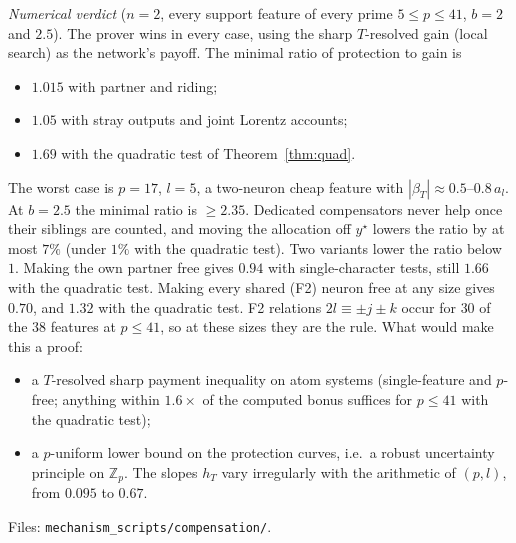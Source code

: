 \documentclass[11pt]{article}
\theoremstyle{definition}
\begin{document}
\emph{Numerical verdict} ($n=2$, every support feature of every prime $5\le p\le41$, $b=2$ and $2.5$).  The prover wins in every case, using the sharp
$T$-resolved gain (local search) as the network's payoff.  The minimal ratio of protection to gain is
\begin{itemize}
\item $1.015$ with partner and riding;
\item $1.05$ with stray outputs and joint Lorentz accounts;
\item $1.69$ with the quadratic test of Theorem~\ref{thm:quad}.
\end{itemize}
The worst case is $p=17$, $l=5$, a two-neuron cheap feature with $|\beta_T|\approx0.5$--$0.8\,a_l$.  At $b=2.5$ the minimal ratio is $\ge2.35$.  Dedicated
compensators never help once their siblings are counted, and moving the allocation off $y^\star$ lowers the ratio by at most $7\%$ (under $1\%$ with
the quadratic test).  Two variants lower the ratio below $1$.  Making the own partner free gives $0.94$ with single-character tests, still $1.66$ with
the quadratic test.  Making every shared (F2) neuron free at any size gives $0.70$, and $1.32$ with the quadratic test.  F2 relations
$2l\equiv\pm j\pm k$ occur for $30$ of the $38$ features at $p\le41$, so at these sizes they are the rule.  What would make this a proof:
\begin{itemize}
\item a $T$-resolved sharp payment inequality on atom systems (single-feature and $p$-free; anything within $1.6\times$ of the computed bonus suffices
for $p\le41$ with the quadratic test);
\item a $p$-uniform lower bound on the protection curves, i.e.\ a robust uncertainty principle on $\mathbb Z_p$.  The slopes $h_T$ vary irregularly with
the arithmetic of $(p,l)$, from $0.095$ to $0.67$.
\end{itemize}
Files: \texttt{mechanism\_scripts/compensation/}.
\end{document}
